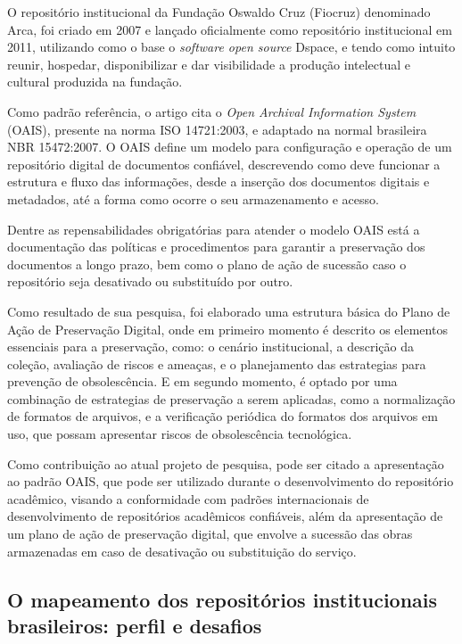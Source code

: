 O repositório institucional da Fundação Oswaldo Cruz (Fiocruz) denominado
Arca, foi criado em 2007 e lançado oficialmente como repositório institucional em 2011,
utilizando como o base o \emph{software open source} Dspace, e tendo como intuito
reunir, hospedar, disponibilizar e dar visibilidade a produção intelectual e cultural
produzida na fundação.

Como padrão referência, o artigo cita o \emph{Open Archival Information System}
(OAIS), presente na norma ISO 14721:2003, e adaptado na normal brasileira
NBR 15472:2007. O OAIS define um modelo para configuração e operação
de um repositório digital de documentos confiável, descrevendo como deve funcionar
a estrutura e fluxo das informações, desde a inserção dos documentos digitais e
metadados, até a forma como ocorre o seu armazenamento e acesso.

Dentre as repensabilidades obrigatórias para atender o modelo OAIS
está a documentação das políticas e procedimentos para garantir
a preservação dos documentos a longo prazo, bem como o plano de ação
de sucessão caso o repositório seja desativado ou substituído por outro.

Como resultado de sua pesquisa, foi elaborado uma estrutura básica
do Plano de Ação de Preservação Digital, onde em primeiro momento
é descrito os elementos essenciais para a preservação, como: o cenário
institucional, a descrição da coleção, avaliação de riscos e ameaças,
e o planejamento das estrategias para prevenção de obsolescência. E em
segundo momento, é optado por uma combinação de estrategias de preservação
a serem aplicadas, como a normalização de formatos de arquivos, e a verificação
periódica do formatos dos arquivos em uso, que possam apresentar riscos
de obsolescência tecnológica.

Como contribuição ao atual projeto de pesquisa, pode ser citado a
apresentação ao padrão OAIS, que pode ser utilizado durante o desenvolvimento
do repositório acadêmico, visando a conformidade com padrões internacionais
de desenvolvimento de repositórios acadêmicos confiáveis, além da apresentação
de um plano de ação de preservação digital, que envolve a sucessão das obras
armazenadas em caso de desativação ou substituição do serviço.

\subsection{O mapeamento dos repositórios institucionais brasileiros: perfil e desafios}

